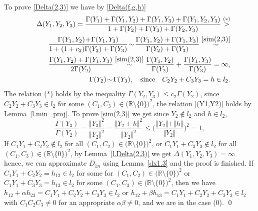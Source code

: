 \documentclass[preprint,12pt]{elsarticle}
\numberwithin{equation}{section}
\begin{document}
\begin{pf}
To prove \eqref{Delta(2,3)}
we have by \eqref{Delta(f,g,h)}
\begin{eqnarray}
\nonumber 
&&
\Delta(Y_1,Y_2,Y_3)=
\frac{\Gamma(Y_1)+\Gamma(Y_1,Y_2)+\Gamma(Y_1,Y_3)+\Gamma(Y_1,Y_2,Y_3)}{1+\Gamma(Y_2)+\Gamma(Y_3)+\Gamma(Y_2,Y_3)}\stackrel{(*)}{>}\\
\nonumber
&&
\frac{
\Gamma(Y_1,Y_2)\!+\!\Gamma(Y_1,Y_3)}{1+(1+c_2)\Gamma(Y_2)+\Gamma(Y_3)}\!\sim\!  \frac{
\Gamma(Y_1,Y_2)+\Gamma(Y_1,Y_3)}{\Gamma(Y_2)+\Gamma(Y_3)
}\stackrel{\eqref{sim(2,3)}}{\sim}\\
\label{(Y1,Y2)}
&&
 \frac{
\Gamma(Y_1,Y_2)+\Gamma(Y_1,Y_3)}{2\Gamma(Y_2)
}\stackrel{\eqref{sim(2,3)}}{\sim}
 \frac{
\Gamma(Y_1,Y_2)}{\Gamma(Y_2)}+\frac{\Gamma(Y_1,Y_3)}{\Gamma(Y_3)
}=\infty,
\\
\label{sim(2,3)}
&&
\Gamma(Y_2)\!\sim\! \Gamma(Y_3),\quad  \text{since}\quad C_2Y_2+C_3Y_3=h\in l_2.
\end{eqnarray}
The relation (*) holds by the inequality
$\Gamma(Y_2,Y_3)\leq c_2\Gamma(Y_2)$,  since $C_2Y_2\!+\!C_3Y_3\!\in\! l_2$ for some $ (C_1,C_3)\in \big(\mathbb R \setminus \{0\}\big)^2$, the relation  \eqref{(Y1,Y2)} holds by Lemma~\ref{l.min=proj}.   
To prove \eqref{sim(2,3)} we get since $Y_2\not\in l_2$ and $h\in l_2$, 
\begin{equation*}
\frac{\Gamma(Y_3)}{\Gamma(Y_2)}=
\frac{\Vert Y_3\Vert^2}{\Vert Y_2\Vert^2}=\frac{\Vert Y_2+h\Vert^2}{\Vert Y_2\Vert^2}\leq \Big(\frac{\Vert Y_2\Vert+\Vert h\Vert}{\Vert Y_2\Vert}\Big)^2=1, 
\end{equation*}
If $C_1Y_1\!+\!C_2Y_2\not\in l_2$ for all $ (C_1,C_2)\in \big(\mathbb R \setminus \{0\}\big)^2$, or $C_1Y_1\!+\!C_3Y_3\not\in l_2$ for all $ (C_1,C_3)\in \big(\mathbb R \setminus \{0\}\big)^2$, by Lemma~\ref{l.Delta(2,3)}  we get $\Delta(Y_1,Y_2,Y_3)=\infty$ hence, we can approximate $D_{1n}$ using Lemma~\ref{dx1.3} and the proof is finished. 
%
If $C_1Y_1\!+\!C_2Y_2=h_{12}\in l_2$ for some  for  $(C_1,C_2)\in \big(\mathbb R \setminus \{0\}\big)^2$ or 
$C_1Y_1\!+\!C_3Y_3=h_{13}\in l_2$ for some $ (C_1,C_3)\in \big(\mathbb R \setminus \{0\}\big)^2$,
then
we have $h_{12}+\alpha h_{23}=C_1Y_1\!+\!C_2Y_2+\!C_3Y_3\in l_2$ or $h_{12}+\beta h_{13}=C_1Y_1\!+\!C_2Y_2+\!C_3Y_3\in l_2$
with $C_1C_2C_3\not=0$ for an appropriate $\alpha\beta\not=0$,  and we are in the case (0).
\qed\end{pf}
%
\end{document}
